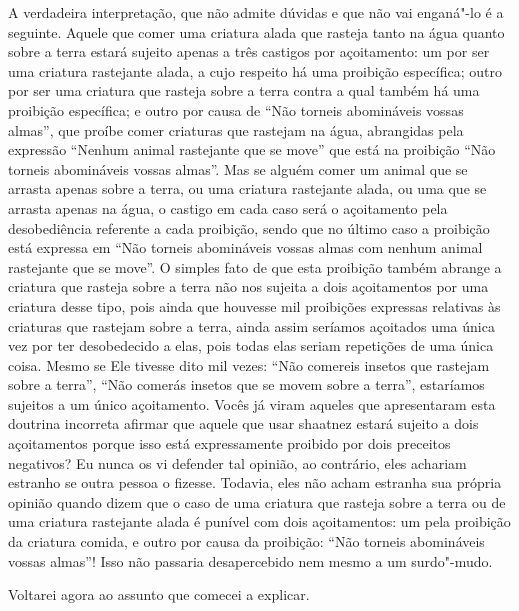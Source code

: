 \begin{multicols}{2}
A verdadeira interpretação, que não admite dúvidas e que não vai
enganá"-lo é a seguinte. Aquele que comer uma criatura alada que rasteja
tanto na água quanto sobre a terra estará sujeito apenas a três castigos
por açoitamento: um por ser uma criatura rastejante alada, a cujo
respeito há uma proibição específica; outro por ser uma criatura que
rasteja sobre a terra contra a qual também há uma proibição específica;
e outro por causa de ``Não torneis abomináveis vossas almas'', que
proíbe comer criaturas que rastejam na água, abrangidas pela expressão
``Nenhum animal rastejante que se move'' que está na proibição ``Não
torneis abomináveis vossas almas''. Mas se alguém comer um animal que
se arrasta apenas sobre a terra, ou uma criatura rastejante alada, ou
uma que se arrasta apenas na água, o castigo em cada caso será o
açoitamento pela desobediência referente a cada proibição, sendo que no
último caso a proibição está expressa em ``Não torneis abomináveis
vossas almas com nenhum animal rastejante que se move''. O simples fato
de que esta proibição também abrange a criatura que rasteja sobre a
terra não nos sujeita a dois açoitamentos por uma criatura desse tipo,
pois ainda que houvesse mil proibições expressas relativas às criaturas
que rastejam sobre a terra, ainda assim seríamos açoitados uma única vez
por ter desobedecido a elas, pois todas elas seriam repetições de uma
única coisa. Mesmo se Ele tivesse dito mil vezes: ``Não comereis insetos
que rastejam sobre a terra'', ``Não comerás insetos que se movem sobre a
terra'', estaríamos sujeitos a um único açoitamento. Vocês já viram
aqueles que apresentaram esta doutrina incorreta afirmar que aquele que
usar shaatnez\starr{} estará sujeito a
dois açoitamentos porque isso está expressamente proibido por dois
preceitos negativos? Eu nunca os vi defender tal opinião, ao contrário,
eles achariam estranho se outra pessoa o fizesse. Todavia, eles não
acham estranha sua própria opinião quando dizem que o caso de uma
criatura que rasteja sobre a terra ou de uma criatura rastejante alada é
punível com dois açoitamentos: um pela proibição da criatura comida, e
outro por causa da proibição: ``Não torneis abomináveis vossas almas''!
Isso não passaria desapercebido nem mesmo a um surdo"-mudo.

Voltarei agora ao assunto que comecei a explicar.


\end{multicols}
